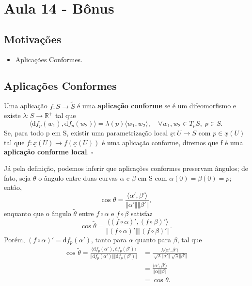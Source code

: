 \documentclass[../differential_geometry.tex]{subfiles}
\begin{document}
\section{Aula 14 - Bônus}
\subsection{Motivações}
\begin{itemize}
	\item Aplicações Conformes.
\end{itemize}
\subsection{Aplicações Conformes}
\begin{def*}
	Uma aplicação \(f:S\rightarrow \tilde{S}\) é uma \textbf{aplicação conforme} se é um difeomorfismo e existe \(\lambda :S\rightarrow \mathbb{R}^+\) tal que
	\[
		\langle \mathrm{d}f_{p}(w_1), \mathrm{d}f_p(w_2) \rangle = \lambda (p) \langle w_1, w_2 \rangle, \quad \forall w_1, w_2\in T_{p}S,\; p\in S.
	\]
	Se, para todo p em S, existir uma parametrização local \(\underline{x}:U\rightarrow S\) com \(p\in \underline{x}(U)\) tal que \(f:\underline{x}(U)\rightarrow f(\underline{x}(U))\) é uma aplicação conforme, diremos que f é uma \textbf{aplicação conforme local}. \(\square\)
\end{def*}
Já pela definição, podemos inferir que aplicações conformes preservam ângulos; de fato, seja \(\theta \) o ângulo entre duas curvas \(\alpha \) e \(\beta \) em S com \(\alpha (0) = \beta (0) = p\); então,
\[
	\cos^{}{\theta } = \frac{\langle \alpha', \beta' \rangle}{\Vert \alpha' \Vert\Vert \beta' \Vert},
\]
enquanto que o ângulo \(\tilde{\theta }\) entre \(f\circ \alpha \) e \(f\circ \beta \) satisfaz
\[
	\cos^{}{\tilde{\theta }} = \frac{\langle (f\circ \alpha )', (f\circ \beta )'  \rangle}{\Vert (f\circ \alpha )' \Vert \Vert (f\circ \beta )' \Vert}.
\]
Porém, \((f\circ \alpha )' = \mathrm{d}f_{p}(\alpha ')\), tanto para \(\alpha \) quanto para \(\beta \), tal que
\begin{align*}
	\cos^{}{\tilde{\theta} } = \frac{\langle \mathrm{d}f_{p}(\alpha '), \mathrm{d}f_p(\beta ') \rangle}{\Vert \mathrm{d}f_p(\alpha ') \Vert\Vert \mathrm{d}f_p(\beta ') \Vert} & = \frac{\lambda \langle \alpha ',\beta '  \rangle}{\sqrt[]{\lambda }\Vert \alpha ' \Vert \sqrt[]{\lambda }\Vert \beta ' \Vert} \\
	                                                                                                                                                                           & = \frac{\langle \alpha ', \beta ' \rangle}{\Vert \alpha  \Vert\Vert \beta  \Vert}                                              \\
	                                                                                                                                                                           & = \cos^{}{\theta }.
\end{align*}
\end{document}
